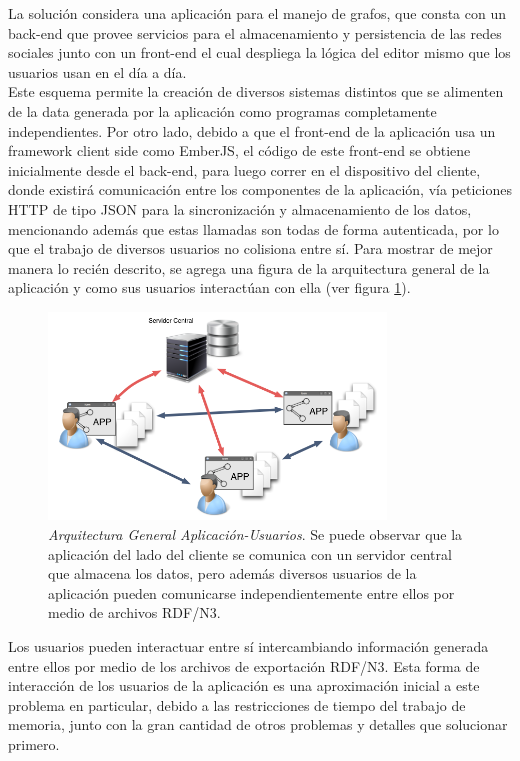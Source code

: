 La solución considera una aplicación para el manejo de grafos, que consta con un back-end que provee servicios para el almacenamiento y persistencia de las redes sociales junto con un front-end el cual despliega la lógica del editor mismo que los usuarios usan en el día a día.\\

Este esquema permite la creación de diversos sistemas distintos que se alimenten de la data generada por la aplicación como programas completamente independientes. Por otro lado, debido a que el front-end de la aplicación usa un framework  client side como EmberJS, el código de este front-end se obtiene inicialmente desde el back-end, para luego correr en el dispositivo del cliente, donde existirá comunicación entre los componentes de la aplicación, vía peticiones HTTP de tipo JSON para la sincronización y almacenamiento de los datos, mencionando además que estas llamadas son todas de forma autenticada, por lo que el trabajo de diversos usuarios no colisiona entre sí. Para mostrar de mejor manera lo recién descrito, se agrega una figura de la arquitectura general de la aplicación y como sus usuarios interactúan con ella (ver figura \ref{app_distribuida}).

\begin{figure}[H]
  \centering
  \includegraphics[width=0.8\textwidth]{images/app_distribuida.png}
  \caption[Arquitectura General Aplicación-Usuarios]{\emph{Arquitectura General Aplicación-Usuarios}. Se puede observar que la aplicación del lado del cliente se comunica con un servidor central que almacena los datos, pero además diversos usuarios de la aplicación pueden comunicarse independientemente entre ellos por medio de archivos RDF/N3.}
  \label{app_distribuida}
\end{figure}

Los usuarios pueden interactuar entre sí intercambiando información generada entre ellos por medio de los archivos de exportación RDF/N3. Esta forma de interacción de los usuarios de la aplicación es una aproximación inicial a este problema en particular, debido a las restricciones de tiempo del trabajo de memoria, junto con la gran cantidad de otros problemas y detalles que solucionar primero.\\

